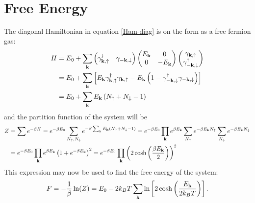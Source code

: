 \section{Free Energy}
\label{sec:FreeEnergy}
The diagonal Hamiltonian in equation \eqref{Ham-diag} is on the form as a free fermion gas:
\begin{equation}
\begin{split}
    H &= E_0 + \sum_{\mathbf{k}} 
    \begin{pmatrix} \gamma_{\bf{k},\uparrow}^{\dagger} & \gamma_{-\bf{k},\downarrow} \end{pmatrix}
    \begin{pmatrix}  E_{\mathbf{k}} & 0 \\ 0 & -E_{\mathbf{k}} \end{pmatrix}
    \begin{pmatrix} \gamma_{\bf{k},\uparrow} \\ \gamma_{-\bf{k},\downarrow}^{\dagger} \end{pmatrix}\\
    &=E_0 + \sum_{\mathbf{k}}\left[ E_{\mathbf{k}}\gamma_{\bf{k},\uparrow}^{\dagger} \gamma_{\bf{k},\uparrow} - E_{\mathbf{k}}\left(1-\gamma_{-\bf{k},\downarrow}^{\dagger}\gamma_{-\bf{k},\downarrow}\right)\right]\\
    &= E_0 + \sum_{\mathbf{k}} E_{\mathbf{k}}\left(N_{\uparrow} + N_{\downarrow} -1\right)
\end{split}
\end{equation}
and the partition function of the system will be
\begin{equation}
\begin{split}
    Z &= \sum e^{-\beta H} = e^{-\beta E_0} \sum_{N_{\uparrow}, N_{\downarrow}} e^{-\beta\sum_kE_{\mathbf{k}}(N_{\uparrow}+N_{\downarrow}-1)} = e^{-\beta E_0} \prod_{\mathbf{k}} e^{\beta E_{\mathbf{k}}}\sum_{N_{\uparrow}} e^{-\beta E_{\mathbf{k}}N_{\uparrow}}\sum_{N_{\downarrow}} e^{-\beta E_{\mathbf{k}}N_{\downarrow}} \\
    &=e^{-\beta E_0} \prod_{\mathbf{k}} e^{\beta E_{\mathbf{k}}}\left(1 + e^{-\beta E_{\mathbf{k}}}\right)^2 = e^{-\beta E_0}\prod_{\mathbf{k}} \left(2\cosh\left(\frac{\beta E_{\mathbf{k}}}{2}\right)\right)^2
\end{split}
\end{equation}
This expression may now be used to find the free energy of the system:
\begin{equation}
    F = -\frac{1}{\beta}\ln(Z)  = E_0 -2k_BT\sum_{\mathbf{k}} \ln\left[2\cosh\left(\frac{E_{\mathbf{k}}}{2k_BT}\right)\right].
\label{FreeEnergy}
\end{equation}
